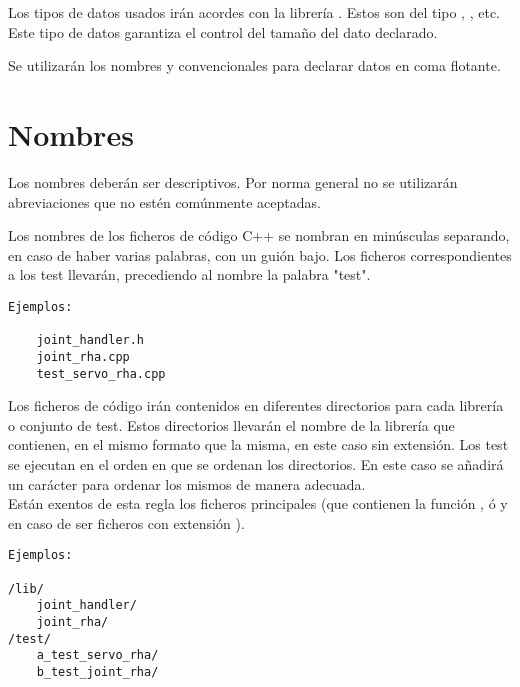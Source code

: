 Los tipos de datos usados irán acordes con la librería . Estos son del tipo , , etc. Este tipo de datos garantiza el control del tamaño del dato declarado.

Se utilizarán los nombres  y  convencionales para declarar datos en coma flotante.

\section{Nombres}\label{sec:codificacionSW:nombres}


Los nombres deberán ser descriptivos. Por norma general no se utilizarán abreviaciones que no estén comúnmente aceptadas.


    Los nombres de los ficheros de código C++ se nombran en minúsculas separando, en caso de haber varias palabras, con un guión bajo. Los ficheros correspondientes a los test llevarán, precediendo al nombre la palabra "test".
    \\ 
    
    \lstset{language=C, breaklines=true, basicstyle=\footnotesize}
        \begin{lstlisting}[frame=single]
Ejemplos:

    joint_handler.h
    joint_rha.cpp
    test_servo_rha.cpp
    \end{lstlisting}


    Los ficheros de código irán contenidos en diferentes directorios para cada librería o conjunto de test. Estos directorios llevarán el nombre de la librería que contienen, en el mismo formato que la misma, en este caso sin extensión. Los test se ejecutan en el orden en que se ordenan los directorios. En este caso se añadirá un carácter para ordenar los mismos de manera adecuada. 
    \\ 
    
    Están exentos de esta regla los ficheros principales (que contienen la función , ó  y  en caso de ser ficheros con extensión ). 
    \\
    \lstset{language=C, breaklines=true, basicstyle=\footnotesize}
    \begin{lstlisting}[frame=single]
Ejemplos:

/lib/
    joint_handler/
    joint_rha/
/test/
    a_test_servo_rha/
    b_test_joint_rha/
    \end{lstlisting}

